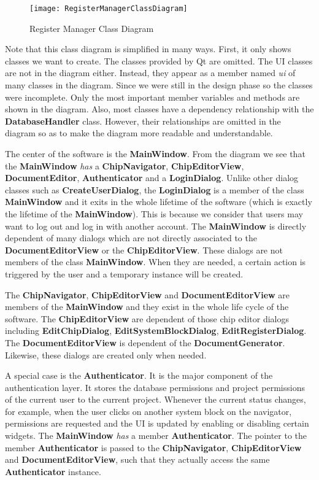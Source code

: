 \begin{figure}[htb]
\centering
\texttt{[image: RegisterManagerClassDiagram]}
\caption{Register Manager Class Diagram\label{fig:Register Manager Class Diagram}}
\end{figure}

Note that this class diagram is simplified in many ways. First, it only shows classes we want to create. The classes provided by Qt are omitted. The UI classes are not in the diagram either. Instead, they appear as a member named \textit{ui} of many classes in the diagram. Since we were still in the design phase so the classes were incomplete. Only the most important member variables and methods are shown in the diagram. Also, most classes have a dependency relationship with the \textbf{DatabaseHandler} class. However, their relationships are omitted in the diagram so as to make the diagram more readable and understandable.

The center of the software is the \textbf{MainWindow}. From the diagram we see that the \textbf{MainWindow} \textit{has} a \textbf{ChipNavigator}, \textbf{ChipEditorView}, \textbf{DocumentEditor}, \textbf{Authenticator} and a \textbf{LoginDialog}. Unlike other dialog classes such as \textbf{CreateUserDialog}, the \textbf{LoginDialog} is a member of the class \textbf{MainWindow} and it exits in the whole lifetime of the software (which is exactly the lifetime of the \textbf{MainWindow}). This is because we consider that users may want to log out and log in with another account. The \textbf{MainWindow} is directly dependent of many dialogs which are not directly associated to the \textbf{DocumentEditorView} or the \textbf{ChipEditorView}. These dialogs are not members of the class \textbf{MainWindow}. When they are needed, a certain action is triggered by the user and a temporary instance will be created.

The \textbf{ChipNavigator}, \textbf{ChipEditorView} and \textbf{DocumentEditorView} are members of the \textbf{MainWindow} and they exist in the whole life cycle of the software. The \textbf{ChipEditorView} are dependent of those chip editor dialogs including \textbf{EditChipDialog}, \textbf{EditSystemBlockDialog}, \textbf{EditRegisterDialog}. The \textbf{DocumentEditorView} is dependent of the \textbf{DocumentGenerator}. Likewise, these dialogs are created only when needed.

A special case is the \textbf{Authenticator}. It is the major component of the authentication layer. It stores the database permissions and project permissions of the current user to the current project. Whenever the current status changes, for example, when the user clicks on another system block on the navigator, permissions are requested and the UI is updated by enabling or disabling certain widgets. The \textbf{MainWindow} \textit{has} a member \textbf{Authenticator}. The pointer to the member \textbf{Authenticator} is passed to the \textbf{ChipNavigator}, \textbf{ChipEditorView} and \textbf{DocumentEditorView}, such that they actually access the same \textbf{Authenticator} instance.

